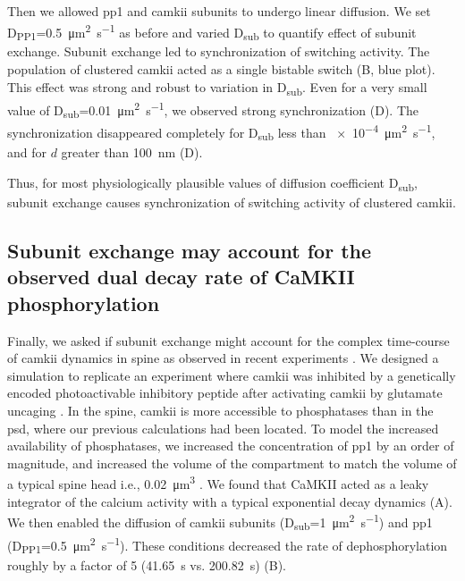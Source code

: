 \documentclass[9pt,lineno,doublespacing]{elife}
\newcommand\SUB[2]{#1\textsubscript{#2}}
\begin{document}
Then we allowed \gls{pp1} and \gls{camkii} subunits to undergo linear diffusion.
We set \SUB{D}{PP1}=\SI{0.5}{\micro\meter\squared\per\second} as before and
varied \SUB{D}{sub} to quantify effect of subunit exchange. Subunit exchange led
to synchronization of switching activity. The population of clustered
\gls{camkii} acted as a single bistable switch (B, blue plot).
This effect was strong and robust to variation in \SUB{D}{sub}. Even for a very
small value of \SUB{D}{sub}=\SI{0.01}{\micro\meter\squared\per\second}, we
observed strong synchronization (D). The synchronization
disappeared completely for \SUB{D}{sub} less than
\SI{e-4}{\micro\meter\squared\per\second}, and for $d$ greater than
\SI{100}{\nano\meter} (D).

Thus, for most physiologically plausible values of diffusion coefficient
\SUB{D}{sub}, subunit exchange causes synchronization of switching activity of
clustered \gls{camkii}.

\subsection{Subunit exchange may account for the observed dual decay rate of
    CaMKII phosphorylation}\label{subsec:camkii_decay_two_time_course}

Finally, we asked if subunit exchange might account for the complex time-course
of \gls{camkii} dynamics in spine as observed in recent experiments
\citep{chang_camkii_2017}. We designed a simulation to replicate an experiment
where \gls{camkii} was inhibited by a genetically encoded photoactivable
inhibitory peptide after activating \gls{camkii} by glutamate uncaging
\citep{murakoshi_kinetics_2017}. In the spine, \gls{camkii} is more accessible
to phosphatases than in the \gls{psd}, where our previous calculations had been
located. To model the increased availability of phosphatases, we increased the
concentration of \gls{pp1} by an order of magnitude, and increased the volume of
the compartment to match the volume of a typical spine head i.e.,
\SI{0.02}{\cubic\micro\meter} \citep{bartol_nanoconnectomic_2015}. We found that
CaMKII acted as a leaky integrator of the calcium activity with a typical
exponential decay dynamics (A). We then enabled the
diffusion of \gls{camkii} subunits
(\SUB{D}{sub}=\SI{1}{\micro\meter\squared\per\second}) and \gls{pp1}
(\SUB{D}{PP1}=\SI{0.5}{\micro\meter\squared\per\second}). These conditions
decreased the rate of dephosphorylation roughly by a factor of 5
(\SI{41.65}{\second} vs. \SI{200.82}{\second}) (B). 
\end{document}
